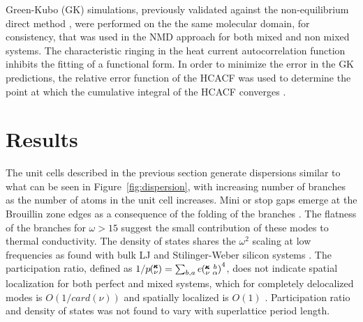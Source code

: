 \documentclass[aps,prb,preprint,preprintnumbers,amsmath,amssymb,floatfix,superscriptaddress]{revtex4}
\newcommand{\kvba}{\mspace{-4.0mu}\left(\mspace{-8.0mu}
\begin{smallmatrix} &\pmb{\kappa} &b \\ &\nu &\alpha\end{smallmatrix}
\mspace{-3.0mu}\right)}
\newcommand{\kv}{\mspace{-4.0mu}\left(\mspace{-8.0mu}
\begin{smallmatrix}&\pmb{\kappa} \\&\nu\end{smallmatrix}
\mspace{-3.0mu}\right)}
\begin{document}
Green-Kubo (GK) simulations, previously validated against the non-equilibrium direct method \cite {PhysRevB.79.075316}, were performed on the the same molecular domain, for consistency, that was used in the NMD approach for both mixed and non mixed systems. The characteristic ringing in the heat current autocorrelation function inhibits the fitting of a functional form. In order to minimize the error in the GK predictions, the relative error function of the HCACF was used to determine the point at which the cumulative integral of the HCACF converges \cite{Chen20102392}.

\section{Results}
The unit cells described in the previous section generate dispersions similar to what can be seen in Figure~\ref{fig:dispersion}, with increasing number of branches as the number of atoms in the unit cell increases. Mini or stop gaps emerge at the Brouillin zone edges as a consequence of the folding of the branches \cite{PhysRevB.38.1427,PhysRevB.60.2627}. The flatness of the branches for $\omega > 15$ suggest the small contribution of these modes to thermal conductivity. The density of states shares the $\omega^2$ scaling at low frequencies as found with bulk LJ and Stilinger-Weber silicon systems \cite{}. The participation ratio, defined as $1/p\kv=\sum_{b,a}e\kvba^4$, does not indicate spatial localization for both perfect and mixed systems, which for completely delocalized modes is $O(1/card(\nu))$ and spatially localized is $O(1)$ \cite{PhysRevB.70.235214}. Participation ratio and density of states was not found to vary with superlattice period length.
\renewcommand{\topfraction}{0.7}
\begin{figure*}[ht!]
\begin{center}
\renewcommand{\figure}{Fig.}
\caption{Dispersion for modes normal to the interfaces, density of states and inverse participation ratio of a 4x4 superlattice. Red squares represent select modes for $\pmb{\kappa}=[1,0,0]$.}
\label{fig:dispersion}
\end{center}
\end{figure*}
\end{document}
